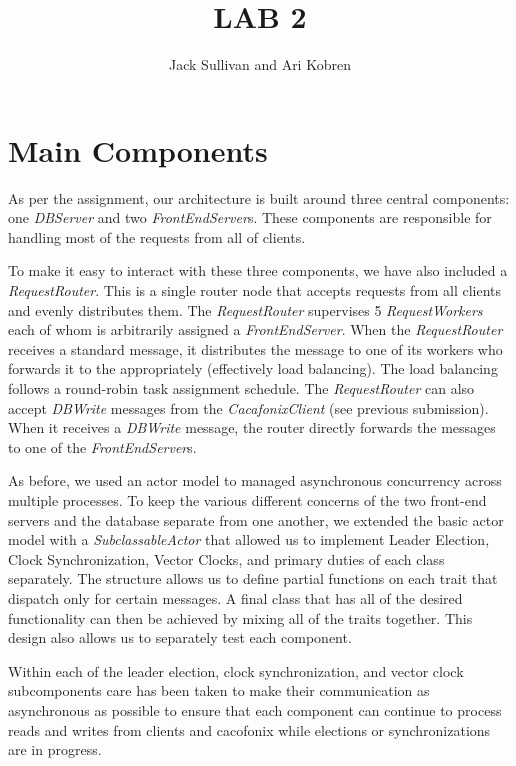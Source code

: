 \documentclass[11pt]{article}
\begin{document}
\title{LAB 2}
\author{Jack Sullivan and Ari Kobren}
\maketitle

\section{Main Components}
As per the assignment, our architecture is built around three central
components: one \emph{DBServer} and two \emph{FrontEndServer}s. These
components are responsible for handling most of the requests from all
of clients.

To make it easy to interact with these three components, we have also
included a \emph{RequestRouter}.  This is a single router node that
accepts requests from all clients and evenly distributes them. The
\emph{RequestRouter} supervises 5 \emph{RequestWorkers} each of whom
is arbitrarily assigned a \emph{FrontEndServer}. When the
\emph{RequestRouter} receives a standard message, it distributes the
message to one of its workers who forwards it to the appropriately
(effectively load balancing). The load balancing follows a round-robin
task assignment schedule.  The \emph{RequestRouter} can also accept
\emph{DBWrite} messages from the \emph{CacafonixClient} (see previous
submission).  When it receives a \emph{DBWrite} message, the router
directly forwards the messages to one of the \emph{FrontEndServer}s.

As before, we used an actor model to managed asynchronous concurrency across multiple processes. To keep the various different concerns of the two front-end servers and the database separate from one another, we extended the basic actor model with a \emph{SubclassableActor} that allowed us to implement Leader Election, Clock Synchronization, Vector Clocks, and primary duties of each class separately. The structure allows us to define partial functions on each trait that dispatch only for certain messages. A final class that has all of the desired functionality can then be achieved by mixing all of the traits together. This design also allows us to separately test each component.

Within each of the leader election, clock synchronization, and vector clock subcomponents care has been taken to make their communication as asynchronous as possible to ensure that each component can continue to process reads and writes from clients and cacofonix while elections or synchronizations are in progress.
\end{document}

